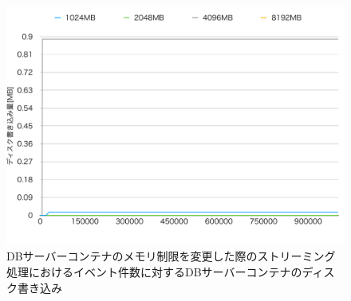 \documentclass[../../../../../main]{subfiles}
\begin{document}
    \begin{figure}[H]
        \centering
        \includegraphics[width=12cm]{graph}
        \caption{DBサーバーコンテナのメモリ制限を変更した際のストリーミング処理におけるイベント件数に対するDBサーバーコンテナのディスク書き込み}
        \label{fig:stream-change-db-memory-limit-db-disk-in-app_4_8192-db_400}
    \end{figure}
\end{document}
